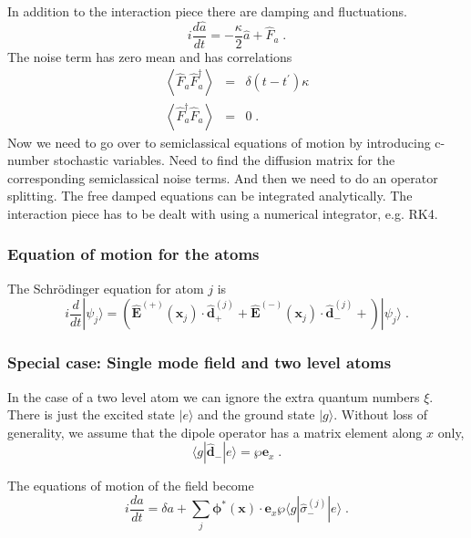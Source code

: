 \documentclass[aps, superscriptaddress, groupedaddress, preprint]{revtex4}
\renewcommand\vec{\mathbf}
\begin{document}
In addition to the interaction piece there are damping
and fluctuations.
\begin{equation}
i\frac{d\hat a}{dt}=
-\frac{\kappa}{2}\hat a + \hat F_a\;.
\end{equation}
The noise term has zero mean and has correlations
\begin{eqnarray}
\left<\hat F_a\hat F_a^\dagger\right>&=&\delta(t-t^\prime)\kappa\\
\left<\hat F_a^\dagger\hat F_a\right>&=&0\;.
\end{eqnarray}
Now we need to go over to semiclassical equations of motion by
introducing c-number stochastic variables.  Need to find the
diffusion matrix for the corresponding semiclassical noise terms.
And then we need to do an operator splitting.  The free damped
equations can be integrated analytically.  The interaction piece
has to be dealt with using a numerical integrator, e.g. RK4.


\subsubsection{Equation of motion for the atoms}

The Schr\"odinger equation for atom $j$ is
\begin{equation}
  i\frac{d}{dt}|\psi_j\rangle =
  \left(
    \vec{\hat E}^{(+)}(\vec{x}_j)\cdot \vec{\hat d}_+^{(j)} +
    \vec{\hat E}^{(-)}(\vec{x}_j)\cdot \vec{\hat d}_-^{(j)} +
  \right)
  |\psi_j\rangle\;.
\end{equation}


\subsubsection{Special case: Single mode field and two level atoms}

In the case of a two level atom we can ignore the extra quantum
numbers $\xi$.  There is just the excited state $|e\rangle$ and
the ground state $|g\rangle$.  Without loss of generality, we
assume that the dipole operator has a matrix element along $x$
only,
\begin{equation}
  \langle g|\vec{\hat{d}}_-|e\rangle = \wp \vec{e}_x\;.
\end{equation}

The equations of motion of the field become
\begin{equation}
  i\frac{da}{dt} =
  \delta a +
  \sum_j\vec{\phi}^*(\vec{x})\cdot
  \vec{e}_x\wp\langle g|\hat\sigma_-^{(j)}|e\rangle\;.
\end{equation}
\end{document}
